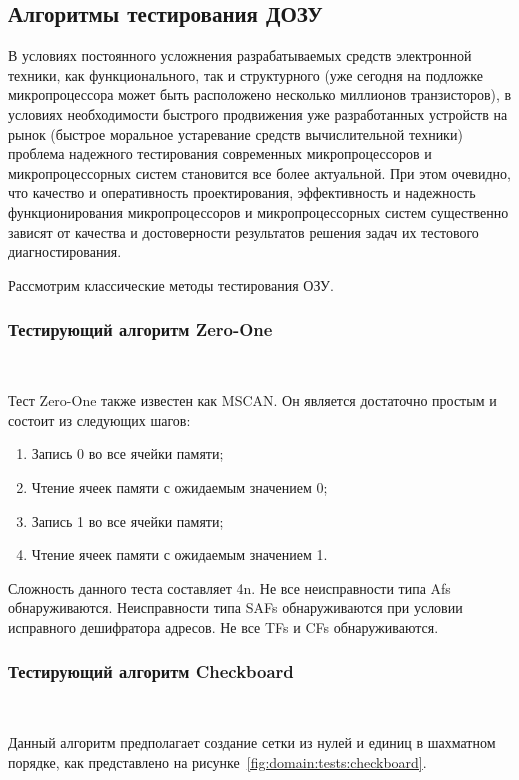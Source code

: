 \subsection{Алгоритмы тестирования ДОЗУ}
\label{page:domain:tests}

В условиях постоянного усложнения разрабатываемых средств электронной техники, как функционального, так и структурного (уже сегодня на подложке микропроцессора может быть расположено несколько миллионов транзисторов), в условиях необходимости быстрого продвижения уже разработанных устройств на рынок (быстрое моральное устаревание средств вычислительной техники) проблема надежного тестирования современных микропроцессоров и микропроцессорных систем становится все более актуальной. При этом очевидно, что качество и оперативность проектирования, эффективность и надежность функционирования микропроцессоров и микропроцессорных систем существенно зависят от качества и достоверности результатов решения задач их тестового диагностирования.

Рассмотрим классические методы тестирования ОЗУ.

\subsubsection{Тестирующий алгоритм Zero-One}~\\
\label{page:domain:tests:zero-one}

Тест Zero-One также известен как MSCAN. Он является достаточно простым и состоит из следующих шагов:
\begin{enumerate}
\item Запись 0 во все ячейки памяти;
\item Чтение ячеек памяти с ожидаемым значением 0;
\item Запись 1 во все ячейки памяти;
\item Чтение ячеек памяти с ожидаемым значением 1.
\end{enumerate}
Сложность данного теста составляет 4n. Не все неисправности типа Afs обнаруживаются. Неисправности типа SAFs обнаруживаются при условии исправного дешифратора адресов. Не все TFs и CFs обнаруживаются.

\subsubsection{Тестирующий алгоритм Checkboard}~\\
\label{page:domain:tests:checkboard}

Данный алгоритм предполагает создание сетки из нулей и единиц в шахматном порядке, как представлено на рисунке~\ref{fig:domain:tests:checkboard}. 

